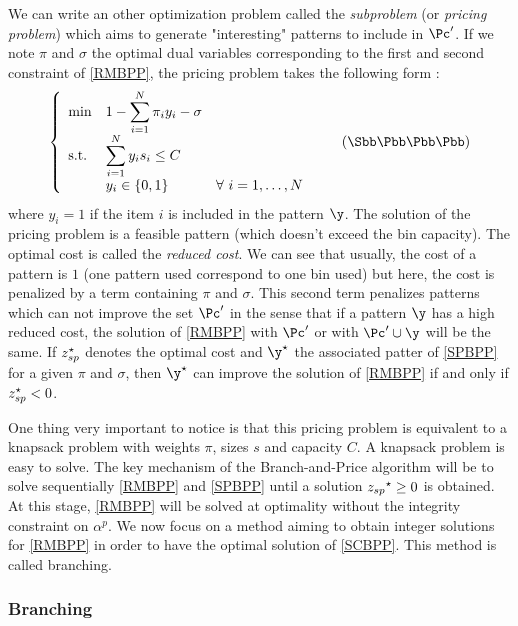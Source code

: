 We can write an other optimization problem called the \textit{subproblem} (or \textit{pricing problem}) which aims to generate "interesting" patterns to include in $\Pc'$. If we note $\pi$ and $\sigma$ the optimal dual variables corresponding to the first and second constraint of \eqref{RMBPP}, the pricing problem takes the following form :
\begin{equation}
	\label{SPBPP}
		\left \{
		\begin{array}{*5{>{\displaystyle}l}}
		\min & 1-\sum_{i=1}^{N} \pi_i y_i - \sigma \\
		\st & \sum_{i=1}^{N} y_i s_i \leq C \\
		& y_i \in \{0,1\} &  \forall \ i = 1,\dots,N
		\end{array}
		\right.
	\tag{$\Sbb\Pbb\Bbb\Pbb\Pbb$}
\end{equation}
where $y_i=1$ if the item $i$ is included in the pattern $\y$. The solution of the pricing problem is a feasible pattern (\ie which doesn't exceed the bin capacity). The optimal cost is called the \textit{reduced cost}. We can see that usually, the cost of a pattern is $1$ (one pattern used correspond to one bin used) but here, the cost is penalized by a term containing $\pi$ and $\sigma$. This second term penalizes patterns which can not improve the set $\Pc'$ in the sense that if a pattern $\y$ has a high reduced cost, the solution of \eqref{RMBPP} with $\Pc'$ or with $\Pc' \cup \y$ will be the same. If ${z}^{\star}_{sp}$ denotes the optimal cost and $\opt{\y}$ the associated patter of \eqref{SPBPP} for a given $\pi$ and $\sigma$, then $\opt{\y}$ can improve the solution of \eqref{RMBPP}
if and only if ${z}^{\star}_{sp}<0$.

One thing very important to notice is that this pricing problem is equivalent to a knapsack problem with weights $\pi$, sizes $s$ and capacity $C$. A knapsack problem is easy to solve. The key mechanism of the Branch-and-Price algorithm will be to solve sequentially \eqref{RMBPP} and \eqref{SPBPP} until a solution ${z_{sp}}^{\star} \geq 0$ is obtained. At this stage, \eqref{RMBPP} will be solved at optimality without the integrity constraint on $\alpha^p$. We now focus on a method aiming to obtain integer solutions for \eqref{RMBPP} in order to have the optimal solution of \eqref{SCBPP}. This method is called branching.

\subsubsection{Branching}


